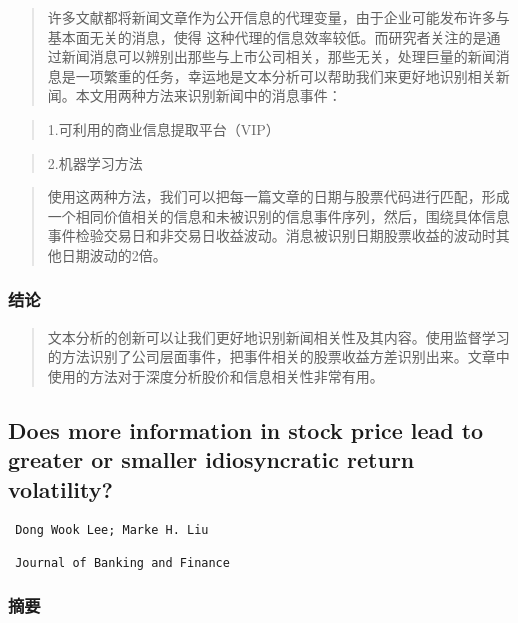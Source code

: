 \documentclass[
]{article}
\begin{document}
\begin{quote}
许多文献都将新闻文章作为公开信息的代理变量，由于企业可能发布许多与基本面无关的消息，使得
这种代理的信息效率较低。而研究者关注的是通过新闻消息可以辨别出那些与上市公司相关，那些无关，处理巨量的新闻消息是一项繁重的任务，幸运地是文本分析可以帮助我们来更好地识别相关新闻。本文用两种方法来识别新闻中的消息事件：
\end{quote}

\begin{quote}
1.可利用的商业信息提取平台（VIP）
\end{quote}

\begin{quote}
2.机器学习方法
\end{quote}

\begin{quote}
使用这两种方法，我们可以把每一篇文章的日期与股票代码进行匹配，形成一个相同价值相关的信息和未被识别的信息事件序列，然后，围绕具体信息事件检验交易日和非交易日收益波动。消息被识别日期股票收益的波动时其他日期波动的2倍。
\end{quote}

\hypertarget{ux7ed3ux8bba}{%
\subsubsection{结论}\label{ux7ed3ux8bba}}

\begin{quote}
文本分析的创新可以让我们更好地识别新闻相关性及其内容。使用监督学习的方法识别了公司层面事件，把事件相关的股票收益方差识别出来。文章中使用的方法对于深度分析股价和信息相关性非常有用。
\end{quote}

\hypertarget{does-more-information-in-stock-price-lead-to-greater-or-smaller-idiosyncratic-return-volatility}{%
\subsection{Does more information in stock price lead to greater or
smaller idiosyncratic return
volatility?}\label{does-more-information-in-stock-price-lead-to-greater-or-smaller-idiosyncratic-return-volatility}}

\begin{verbatim}
 Dong Wook Lee; Marke H. Liu
 
 Journal of Banking and Finance
\end{verbatim}

\hypertarget{ux6458ux8981-3}{%
\subsubsection{摘要}\label{ux6458ux8981-3}}
\end{document}
